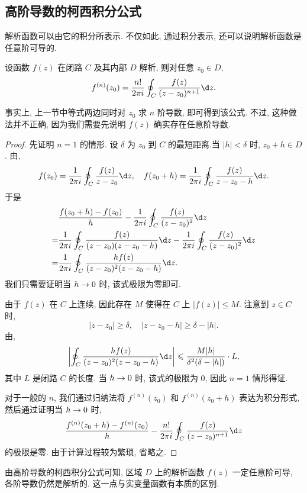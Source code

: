 \subsection{高阶导数的柯西积分公式}

解析函数可以由它的积分所表示.
不仅如此, 通过积分表示, 还可以说明\alert{解析函数是任意阶可导的}.

\begin{theorem}[柯西积分公式]\label{thm:Cauchy-integral-high-order}
  设函数 $f(z)$ 在闭路 $C$ 及其内部 $D$ 解析, 则对任意 $z_0\in D$,
  \[
    f^{(n)}(z_0)=\frac{n!}{2\pi i}\oint_C\frac{f(z)}{(z-z_0)^{n+1}}\d z.
  \]
\end{theorem}

事实上, 上一节中\thmCI 等式两边同时对 $z_0$ 求 $n$ 阶导数, 即可得到该公式.
不过, 这种做法并不正确, 因为我们需要先说明 $f(z)$ 确实存在任意阶导数.

\begin{proof}
  先证明 $n=1$ 的情形.
  设 $\delta$ 为 $z_0$ 到 $C$ 的最短距离.当 $|h|<\delta$ 时, $z_0+h\in D$.
  由\thmCI,
  \[
    f(z_0)=\frac1{2\pi i}\oint_C\frac{f(z)}{z-z_0}\d z,\quad
    f(z_0+h)=\frac1{2\pi i}\oint_C\frac{f(z)}{z-z_0-h}\d z.
  \]
  于是
  \begin{align*}
    &\frac{f(z_0+h)-f(z_0)}h-\frac1{2\pi i}\oint_C\frac{f(z)}{(z-z_0)^2}\d z\\
    =&\frac1{2\pi i}\oint_C\frac{f(z)}{(z-z_0)(z-z_0-h)}\d z
    -\displaystyle\frac1{2\pi i}\oint_C\frac{f(z)}{(z-z_0)^2}\d z\\
    =&\frac1{2\pi i}\oint_C\frac{h f(z)}{(z-z_0)^2(z-z_0-h)}\d z.
  \end{align*}
  我们只需要证明当 $h\rightarrow 0$ 时, 该式极限为零即可.

  由于 $f(z)$ 在 $C$ 上连续, 因此存在 $M$ 使得在 $C$ 上 $|f(z)|\le M$. 注意到 $z\in C$ 时,
  \[
    |z-z_0|\ge \delta,\quad
    |z-z_0-h|\ge\delta-|h|.
  \]
  由\thmGrowUp,
  \[
    \abs{\oint_C\frac{h f(z)}{(z-z_0)^2(z-z_0-h)}\d z}\le\frac{M|h|}{\delta^2(\delta-|h|)}\cdot L,
  \]
  其中 $L$ 是闭路 $C$ 的长度.
  当 $h\rightarrow0$ 时, 该式的极限为 $0$, 因此 $n=1$ 情形得证.

  对于一般的 $n$, 我们通过归纳法将 $f^{(n)}(z_0)$ 和 $f^{(n)}(z_0+h)$ 表达为积分形式, 然后通过\thmGrowUp 证明当 $h\rightarrow 0$ 时,
  \[
    \frac{f^{(n)}(z_0+h)-f^{(n)}(z_0)}h
    -\frac{n!}{2\pi i}\oint_C\frac{f(z)}{(z-z_0)^{n+1}}\d z
  \]
  的极限是零.
  由于计算过程较为繁琐, 省略之.
\end{proof}

由高阶导数的柯西积分公式可知, 区域 $D$ 上的解析函数 $f(z)$ 一定任意阶可导, 各阶导数仍然是解析的. \alert{这一点与实变量函数有本质的区别}.

